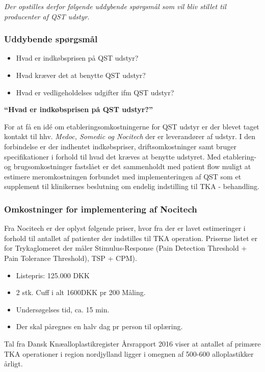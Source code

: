 \textit{Der opstilles derfor følgende uddybende spørgsmål som vil bliv stillet til producenter af QST udstyr. }

\subsubsection*{Uddybende spørgsmål}

\begin{itemize}  
\item Hvad er indkøbsprisen på QST udstyr? 
\item Hvad kræver det at benytte QST udstyr? 
\item Hvad er vedligeholdelses udgifter ifm QST udstyr?
\end{itemize}

\textbf{“Hvad er indkøbsprisen på QST udstyr?”} 

For at få en idé om etableringsomkostningerne for QST udstyr er der blevet taget kontakt til hhv. \emph{Medoc, Somedic og Nocitech} der er leverandører af udstyr. I den forbindelse er der indhentet indkøbspriser, driftsomkostninger samt bruger specifikationer i forhold til hvad det kræves at benytte udstyret. Med etablering- og brugsomkostninger fastslået er det sammenholdt med patient flow muligt at estimere meromkostningen forbundet med implementeringen af QST som et supplement til klinikernes beslutning om endelig indstilling til TKA - behandling. 

\subsubsection*{Omkostninger for implementering af Nocitech}

Fra Nocitech er der oplyst følgende priser, hvor fra der er lavet estimeringer i forhold til antallet af patienter der indstilles til TKA operation. Priserne listet er for Trykaglomeret der måler Stimulus-Response (Pain Detection Threshold + Pain Tolerance Threshold), TSP + CPM).

\begin{itemize}  
\item Listepris: 125.000 DKK
\item 2 stk. Cuff i  alt 1600DKK pr 200 Måling.
\item Undersøgelses tid, ca. 15 min.
\item Der skal påregnes en halv dag pr person til oplæring.
\end{itemize}

Tal fra Dansk Knæalloplastikregister Årsrapport 2016 viser at antallet af primære TKA operationer i region nordjylland ligger i omegnen af 500-600 alloplastikker årligt.\citep{aarsrapport2016} 

